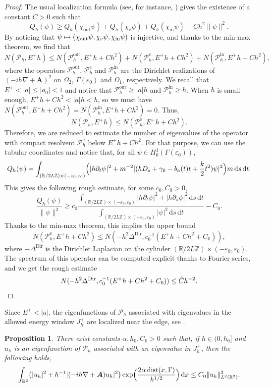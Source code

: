 \documentclass[10pt]{amsart}
\newcommand\mto{\mathchoice{\longmapsto}{\mapsto}{\mapsto}{\mapsto}}
\let\epsilon\varepsilon
\newcommand{\rd}{\,\mathrm{d}}
\newcommand{\Dir}{\mathrm{Dir}}
\newcommand{\rme}{\mathrm{e}}
\newcommand{\rin}{\mathrm{in}}
\newcommand{\out}{\mathrm{out}}
\DeclareMathOperator{\dist}{dist}
\newcommand{\cP}{\mathcal{P}}
\theoremstyle{plain}
\newtheorem{proposition}[theorem]{Proposition}
\theoremstyle{definition}
\newcommand{\A}{\boldsymbol{A}}
\newcommand{\R}{\mathbb{R}}
\begin{document}
\begin{proof}
The usual localization formula (see, for instance, \cite[\S 4.1.1]{Ray}) gives the existence of a constant $C>0$ such that
\[
Q_h(\psi)\geq Q_h(\chi_{\out}\psi)+Q_h(\chi_{\rme}\psi)+Q_h(\chi_{\rin}\psi)-Ch^2\|\psi\|^2.
\]
By noticing that $\psi\mto(\chi_{\out}\psi,\chi_{\rme}\psi,\chi_{\rin}\psi)$ is injective, and thanks to the min-max theorem, we find that
\[
N(\cP_h, E^+h)\leq N(\cP^{\out}_h,E^+h+Ch^2)+N(\cP_h^{\rme},E^+h+Ch^2)+N(\cP_h^{\rin},E^+h+Ch^2),
\]
where the operators $\cP^{\out}_h$, $\cP^{\rme}_h$ and $\cP^{\rin}_h$ are the Dirichlet realizations of $(-ih\nabla+\A)^2$ on $\Omega_2$, $\Gamma(\epsilon_0)$ and $\Omega_1$, respectively.
We recall that $E^+<|a|\leq |a_0|<1$ and notice that $\cP^{\out}_h\geq |a|h$ and $\cP^{\rin}_h\geq h$. When $h$ is small enough, $E^+h+Ch^2<|a|h<h$, so we must have $N(\cP^{\out}_h,E^+h+Ch^2)=N(\cP^{\rin}_h,E^+h+Ch^2)=0$. Thus,
\[
N(\cP_h, E^+h)\leq N(\cP_h^{\rme},E^+h+Ch^2).
\]
Therefore, we are reduced to estimate the number of eigenvalues of the operator with compact resolvent $\cP_h^{\rme}$ below $E^+h+Ch^2$. For that purpose, we can use the tubular coordinates and notice that, for all $\psi\in H^1_0(\Gamma(\epsilon_0))$,
\[
Q_h(\psi)=\int_{(\mathbb R/ 2L \mathbb Z)\times(-\epsilon_0,\epsilon_0)}\Bigl(|h\partial_t\psi|^2+m^{-2}|(hD_s+\gamma_0-b_a(t)t+\frac{k}{2}t^2)\psi|^2\Bigr)m\rd s\rd t.
\]
This gives the following rough estimate, for some $c_0,C_0>0$,
\[
\frac{Q_h(\psi)}{\|\psi\|^2}\geq c_0\frac{\int_{(\mathbb R/ 2L \mathbb Z)\times(-\epsilon_0,\epsilon_0)} |h\partial_t\psi|^2+|h\partial_s\psi|^2\rd s\rd t}{\int_{(\mathbb R/ 2L \mathbb Z)\times(-\epsilon_0,\epsilon_0)} |\psi|^2\rd s\rd t}-C_0.
\]
Thanks to the min-max theorem, this implies the upper bound
\[
N(\cP_h^{\rme},E^+h+Ch^2)\leq N(-h^2\Delta^{\Dir},c_0^{-1}(E^+h+Ch^2+C_0)),
\]
where $-\Delta^{\Dir}$ is the Dirichlet Laplacian on the cylinder $(\mathbb R/ 2L \mathbb Z)\times(-\epsilon_0,\epsilon_0)$. The spectrum of this operator can be computed explicit thanks to Fourier series, and we get the rough estimate
\[
N(-h^2\Delta^{\Dir},c_0^{-1}(E^+h+Ch^2+C_0))\leq\tilde Ch^{-2}.\qedhere
\]
\end{proof}

Since $E^+<|a|$, the eigenfunctions of $\cP_h$ associated with eigenvalues in the allowed energy window $J^+_h$ are localized near the edge, see \cite{AK20}.

\begin{proposition}\label{prop:dec}
There exist constants $\alpha,h_0,C_0>0$ such that, if $h\in (0,h_0]$ and~$u_h$ is an eigenfunction of $\cP_h$ associated with an eigenvalue in $J^+_h$, then the following holds,
\begin{equation}\label{eq:dec-norm}
\int_{\mathbb R^2}\bigl(|u_{h}|^2+h^{-1}|(-ih\nabla+\A)u_{h}|^2 \bigr)\exp\Bigl(\frac{2\alpha\dist(x,\Gamma)}{h^{1/2}} \Bigr)\rd x\leq C_0\|u_h\|^2_{L^2(\R^2)}.
\end{equation}
\end{proposition}
\end{document}
